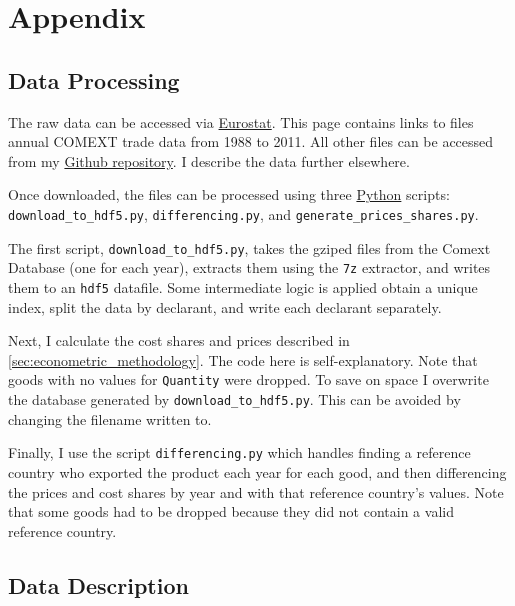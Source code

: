\documentclass[12pt,a4paper]{article}                      %
\begin{document}



\newpage

\section{Appendix}
\label{sec:appendix}

\subsection{Data Processing}
\label{sec:data_processing}

The raw data can be accessed via \href{http://epp.eurostat.ec.europa.eu/NavTree\_prod/everybody/BulkDownloadListing?sort=1\&dir=comext%2F2012S2%2Fdata}{Eurostat}.  This page contains links to files annual COMEXT trade data from 1988 to 2011.
All other files can be accessed from my \href{https://github.com/TomAugspurger/data-wrangling/tree/master/new_start}{Github repository}.
I describe the data further elsewhere.


Once downloaded, the files can be processed using three \href{www.python.org}{Python} scripts: \texttt{download\_to\_hdf5.py}, \texttt{differencing.py}, and \texttt{generate\_prices\_shares.py}.

 
The first script, \texttt{download\_to\_hdf5.py}, takes the gziped files from the Comext Database (one for each year), extracts them using the \texttt{7z} extractor, and writes them to an \texttt{hdf5} datafile.  Some intermediate logic is applied obtain a unique index, split the data by declarant, and write each declarant separately.


Next, I calculate the cost shares and prices described in \ref{sec:econometric_methodology}.  The code here is self-explanatory. Note that goods with no values for \texttt{Quantity} were dropped. To save on space I overwrite the database generated by \texttt{download\_to\_hdf5.py}.  This can be avoided by changing the filename written to.


Finally, I use the script \texttt{differencing.py} which handles finding a reference country who exported the product each year for each good, and then differencing the prices and cost shares by year and with that reference country's values.  Note that some goods had to be dropped because they did not contain a valid reference country.

\subsection{Data Description}
\end{document}
